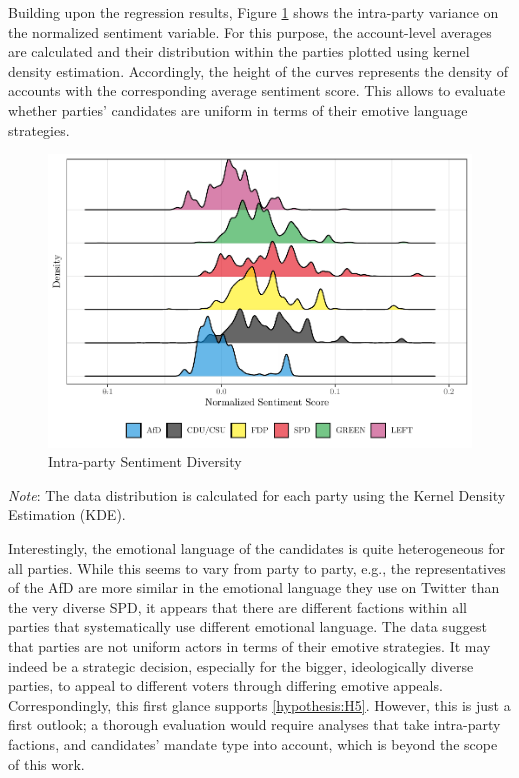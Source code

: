 \documentclass[a4paper,11pt]{article}
\begin{document}
Building upon the regression results, Figure \texttt{\ref{fig:plotintrapartydiversity}} shows the intra-party variance on the normalized sentiment variable. For this purpose, the account-level averages are calculated and their distribution within the parties plotted using kernel density estimation. Accordingly, the height of the curves represents the density of accounts with the corresponding average sentiment score. This allows to evaluate whether parties' candidates are uniform in terms of their emotive language strategies.
\newpage
\begin{figure}[H]

{\centering \includegraphics[width=1\linewidth]{thesis_files/figure-latex/plotintrapartydiversity-1} 

}

\caption{Intra-party Sentiment Diversity}\label{fig:plotintrapartydiversity}
\end{figure}
\vspace{-1cm}
    \begin{minipage}{\linewidth}
    \begin{center}
    \scriptsize
    \textit{Note}: The data distribution is calculated for each party using the Kernel Density Estimation (KDE).
    \end{center}
    \end{minipage}\vspace{0.2cm}
Interestingly, the emotional language of the candidates is quite heterogeneous for all parties. While this seems to vary from party to party, e.g., the representatives of the AfD are more similar in the emotional language they use on Twitter than the very diverse SPD, it appears that there are different factions within all parties that systematically use different emotional language. The data suggest that parties are not uniform actors in terms of their emotive strategies. It may indeed be a strategic decision, especially for the bigger, ideologically diverse parties, to appeal to different voters through differing emotive appeals. Correspondingly, this first glance supports \ref{hypothesis:H5}. However, this is just a first outlook; a thorough evaluation would require analyses that take intra-party factions, and candidates' mandate type into account, which is beyond the scope of this work.
\end{document}
